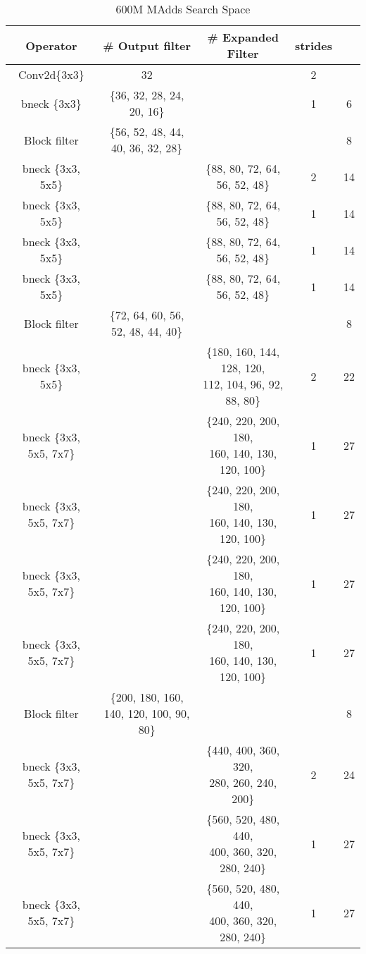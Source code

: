 \begin{table}
\caption{600M MAdds Search Space} 
\begin{center}

\begin{tabular}[hp]{c|c|c|c|c}
\hline
\hline
 Operator  &\# Output filter &\# Expanded Filter &strides &\\ 
\hline
  Conv2d\{3x3\} &32 & &2 \\
\hline
  bneck \{3x3\} & \{36, 32, 28, 24, 20, 16\} & &1 &6 \\
\hline
  Block filter &\{56, 52, 48, 44, 40, 36, 32, 28\} & & &8 \\
  bneck \{3x3, 5x5\} & &\{88, 80, 72, 64, 56, 52, 48\} &2 &14 \\
  bneck \{3x3, 5x5\} & &\{88, 80, 72, 64, 56, 52, 48\} &1 &14 \\
  bneck \{3x3, 5x5\} & &\{88, 80, 72, 64, 56, 52, 48\} &1 &14 \\
  bneck \{3x3, 5x5\} & &\{88, 80, 72, 64, 56, 52, 48\} &1 &14 \\
\hline
Block filter &\{72, 64, 60, 56, 52, 48, 44, 40\} & & &8 \\
  bneck \{3x3, 5x5\} & &\shortstack{\{180, 160, 144, 128, 120, \\ 112, 104, 96, 92, 88, 80\}} &2 &22 \\
  bneck \{3x3, 5x5, 7x7\} & &\shortstack{\{240, 220, 200, 180, \\ 160, 140, 130, 120, 100\}} &1 &27 \\
  bneck \{3x3, 5x5, 7x7\} & &\shortstack{\{240, 220, 200, 180, \\160, 140, 130, 120, 100\}} &1 &27 \\
  bneck \{3x3, 5x5, 7x7\} & &\shortstack{\{240, 220, 200, 180, \\ 160, 140, 130, 120, 100\}} &1 &27 \\
  bneck \{3x3, 5x5, 7x7\} & &\shortstack{\{240, 220, 200, 180, \\ 160, 140, 130, 120, 100\}} &1 &27 \\
\hline
Block filter &\{200, 180, 160, 140, 120, 100, 90, 80\} & & &8 \\
  bneck \{3x3, 5x5, 7x7\} & &\shortstack{\{440, 400, 360, 320, \\280, 260, 240, 200\}} &2 &24 \\
  bneck \{3x3, 5x5, 7x7\} & &\shortstack{\{560, 520, 480, 440, \\ 400, 360, 320, 280, 240\}} &1 &27 \\
  bneck \{3x3, 5x5, 7x7\} & &\shortstack{\{560, 520, 480, 440, \\ 400, 360, 320, 280, 240\}} &1 &27 \\

\end{tabular}
\end{center}
\end{table}

